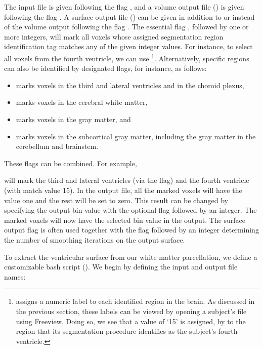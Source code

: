 The input file is given following the flag , and a volume
output file () is given following the flag . A
surface output file () can be given in addition to or
instead of the volume output following the flag . The
essential flag , followed by one or more integers, will mark
all voxels whose assigned segmentation region identification tag matches any of 
the given integer values. For instance, to select all voxels from the fourth 
ventricle, we can use \footnote{{\freesurfer} assigns a numeric 
label to each identified region in the brain.  As discussed in the previous 
section, these labels can be viewed by opening a subject's  file 
using Freeview.  Doing so, we see that a value of `15' is assigned, by 
{\freesurfer} to the region that its segmentation procedure identifies as 
the subject's fourth ventricle.}. 
Alternatively, specific regions can 
also be identified by designated flags, for instance, as follows:
\begin{itemize}
\item {} marks voxels in the third and lateral ventricles and in the choroid plexus,
\item {} marks voxels in the cerebral white matter,
\item {} marks voxels in the gray matter, and  
\item {} marks voxels in the subcortical gray matter, including the gray matter in the cerebellum and brainstem.  
\end{itemize}
These flags can be combined. For example,

\noindent will mark the third and lateral ventricles (via the
 flag) and the fourth ventricle (with match value
15). In the output file, all the marked voxels will have the value one
and the rest will be set to zero. This result can be changed by specifying the
output bin value with the optional flag  followed by an
integer. The marked voxels will now have the selected bin value in the
output. The surface output flag  is often used together
with the flag  followed by an integer determining
the number of smoothing iterations on the output surface. 

To extract the ventricular surface from our white matter parcellation,
we define a customizable bash script (). We begin by defining the input and output file names:


